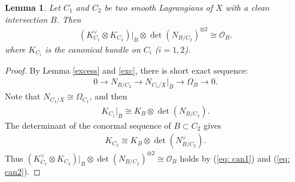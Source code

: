 \documentclass[10pt,a4paper]{amsart}
\newtheorem{lemma}{Lemma}
\newcommand{\arw}{\longrightarrow}
\newcommand{\shO}{\mathcal{O}}
\begin{document}
\begin{lemma}\label{lem: canlag}
Let $C_1$ and $C_2$ be two smooth Lagrangians of $X$ with a clean intersection $B$. Then
\begin{align*}
    (K_{C_1}^{\vee}\otimes K_{C_2})|_B\otimes \det(N_{B/C_2})^{\otimes2}\cong \shO_B.
\end{align*}
    where $K_{C_i}$ is the canonical bundle on $C_i$ ($i=1, 2$).
\end{lemma}

\begin{proof}
    By Lemma \ref{excess} and \ref{exc}, there is short exact sequence:
    \begin{align*}
        0\arw N_{B/C_2} \arw N_{C_1/X}|_B\arw \Omega_B\arw 0.
    \end{align*}
    Note that $N_{C_1/X}\cong \Omega_{C_1}$, and then
    \begin{align}\label{eq: can1}
        K_{C_1}|_B\cong K_B\otimes \det(N_{B/C_2}).
    \end{align}
    The determinant of the conormal sequence of $B\subset C_2$ gives
    \begin{align}\label{eq: can2}
        K_{C_2}\cong K_B\otimes \det(N_{B/C_2}^{\vee}).
    \end{align}
    Thus $(K_{C_1}^{\vee}\otimes K_{C_2})|_B\otimes \det(N_{B/C_2})^{\otimes2}\cong \shO_B$ holds by (\ref{eq: can1}) and (\ref{eq: can2}).
\end{proof}
\end{document}

